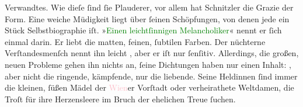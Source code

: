 {{                  Verwandtes. Wie dieſe ſind ſie Plauderer, vor allem hat Schnitzler die Grazie der
                  Form. Eine weiche Müdigkeit liegt über ſeinen Schöpfungen, von denen jede ein
                  Stück Selbstbiographie iſt. »\textcolor{green}{Einen leichtſinnigen Melancholiker}{}\ledrightnote{{$\rightarrow$}\textcolor{green}{Weihnachts-Einkäufe}}« nennt er ſich einmal darin. Er liebt
                  die matten, feinen, ſubtilen Farben. Der nüchterne Verſtandesmenſch nennt ihn
                  leicht , aber er iſt nur ſenſitiv. Allerdings,
                  die großen, neuen Probleme gehen ihn nichts an, ſeine Dichtungen haben nur einen
                  Inhalt: , aber nicht die ringende, kämpfende,
                  nur die liebende. Seine Heldinnen ſind immer die kleinen, ſüßen Mädel der \textcolor{pink}{Wien}{}\ledrightnote{\textcolor{pink}{Wien}}er Vorſtadt oder verheirathete Weltdamen,
                  die Troſt für ihre Herzensleere im Bruch der ehelichen Treue ſuchen.}}\pend
           \pstart
